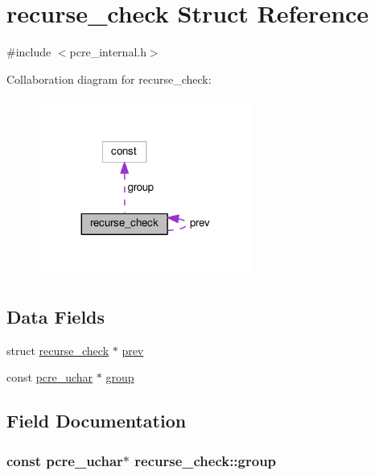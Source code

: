 \hypertarget{structrecurse__check}{}\section{recurse\+\_\+check Struct Reference}
\label{structrecurse__check}


{\ttfamily \#include $<$pcre\+\_\+internal.\+h$>$}



Collaboration diagram for recurse\+\_\+check\+:
\nopagebreak
\begin{figure}[H]
\begin{center}
\leavevmode
\includegraphics[width=200pt]{structrecurse__check__coll__graph}
\end{center}
\end{figure}
\subsection*{Data Fields}
\begin{DoxyCompactItemize}
\item 
struct \hyperlink{structrecurse__check}{recurse\+\_\+check} $\ast$ \hyperlink{structrecurse__check_a9ab7a062e2fbde353f41aafd66d8486e}{prev}
\item 
const \hyperlink{pcre__internal_8h_a9d8efd0ad5b191db2a1793268600deb9}{pcre\+\_\+uchar} $\ast$ \hyperlink{structrecurse__check_a37785ae2ffab81a7a2c8fe8323f9436c}{group}
\end{DoxyCompactItemize}


\subsection{Field Documentation}
\subsubsection[{\texorpdfstring{group}{group}}]{\setlength{\rightskip}{0pt plus 5cm}const {\bf pcre\+\_\+uchar}$\ast$ recurse\+\_\+check\+::group}\hypertarget{structrecurse__check_a37785ae2ffab81a7a2c8fe8323f9436c}{}\label{structrecurse__check_a37785ae2ffab81a7a2c8fe8323f9436c}
